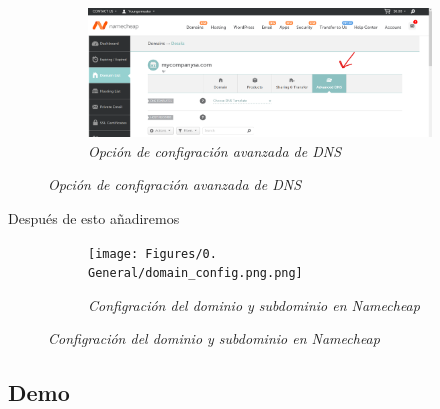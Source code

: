\begin{figure}[H]
    \centering
    \begin{subfigure}[b]{0.8\textwidth}
        \centering
        \includegraphics[width=\textwidth]{Figures/0. General/advanced_config_selection.png}
        \caption{\textit{Opción de configración avanzada de DNS}}
        \label{fig: advanced dns configuration}
    \end{subfigure}
\end{figure}

Después de esto añadiremos

\begin{figure}[H]
    \centering
    \begin{subfigure}[b]{0.8\textwidth}
        \centering
        \texttt{[image: Figures/0. General/domain\_config.png.png]}
        \caption{\textit{Configración del dominio y subdominio en Namecheap}}
        \label{fig: domain configuration}
    \end{subfigure}
\end{figure}

\subsection{Demo}